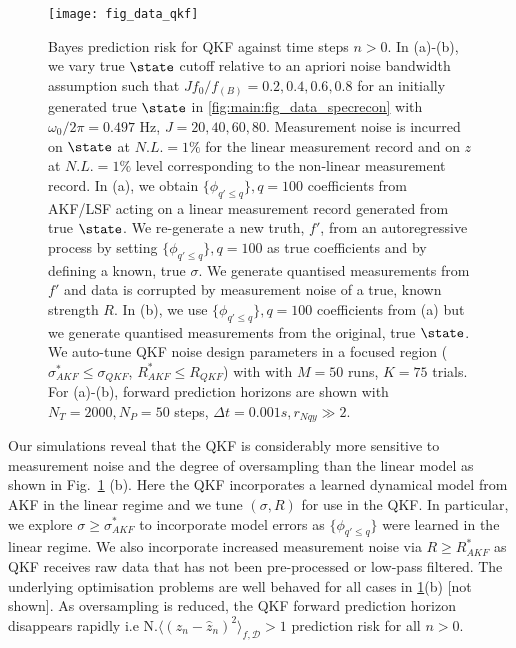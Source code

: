 \begin{figure}[h!]
    \texttt{[image: fig\_data\_qkf]}
    \caption{\label{fig:main:fig_data_qkf2} Bayes prediction risk for QKF against time steps $n>0$. In (a)-(b), we vary true $\state$ cutoff relative to an apriori noise bandwidth assumption such that $J f_0 / f_{(B)} = 0.2, 0.4, 0.6, 0.8$ for an initially generated true $\state$ in \cref{fig:main:fig_data_specrecon} with $\omega_0/ 2\pi = 0.497 $ Hz, $J = 20, 40, 60, 80$. Measurement noise is incurred on $\state$ at $N.L. = 1 \%$ for the linear measurement record and on $z$ at $N.L. = 1\%$ level corresponding to the non-linear measurement record. In (a), we obtain $\{\phi_{q' \leq q}\}, q=100$ coefficients from AKF/LSF acting on a linear measurement record generated from true $\state$. We re-generate a new truth, $f'$, from an autoregressive process by setting $\{\phi_{q'\leq q}\}, q=100$ as true coefficients and by defining a known, true $\sigma$. We generate quantised measurements from $f'$ and data is corrupted by measurement noise of a true, known strength $R$. In (b), we use $\{\phi_{q' \leq q} \}, q=100$ coefficients from (a) but we generate quantised measurements from the original, true $\state$. We auto-tune QKF noise design parameters in a focused region ($\sigma_{AKF}^* \leq \sigma_{QKF}$, $R_{AKF}^* \leq R_{QKF}$) with with $M=50$ runs, $K=75$ trials. For (a)-(b), forward prediction horizons are shown with $N_T = 2000, N_P = 50$ steps, $\Delta t = 0.001s, r_{Nqy}\gg 2$.}
\end{figure}



Our simulations reveal that the QKF is considerably more sensitive to measurement noise and the degree of oversampling than the linear model as shown in Fig.~\ref{fig:main:fig_data_qkf2} (b). Here the QKF incorporates a learned dynamical model from AKF in the linear regime and we tune $(\sigma, R)$ for use in the QKF.  In particular, we explore $\sigma \geq \sigma_{AKF}^*$ to incorporate model errors as $\{\phi_{q' \leq q}\}$ were learned in the linear regime.  We also incorporate increased measurement noise via $R \geq R_{AKF}^*$ as QKF receives raw data that has not been pre-processed or low-pass filtered. The underlying optimisation problems are well behaved for all cases in \cref{fig:main:fig_data_qkf2}(b) [not shown].  As oversampling is reduced, the QKF forward prediction horizon disappears rapidly i.e $\text{N.} \langle (z_n - \hat{z}_n)^2 \rangle_{f, \mathcal{D}} > 1 $ prediction risk for all $n>0$.  




